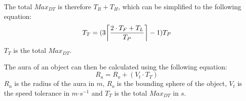 The total $Max_{DT}$ is therefore $T_{R}+T_{H}$, which can be simplified to the following equation:
\begin{equation}
T_{T}=(3\ceil*{\frac{2\cdot T_{F} + T_{L}}{T_{P}}}-1)T_{P}
\end{equation}
$T_{T}$ is the total $Max_{DT}$.

The aura of an object can then be calculated using the following equation: 
\begin{equation}\label{auraEquation}
R_{a}=R_{o}+(V_{t}\cdot T_{T})
\end{equation}
$R_{a}$ is the radius of the aura in $m$, $R_{o}$ is the bounding sphere of the object, $V_{t}$ is the speed tolerance in $m\mathord{\cdot}s^{-1}$ and $T_{T}$ is the total $Max_{DT}$ in $s$.

\begin{figure}[!t]	
	\begin{tikzpicture}[line cap=round,line join=round,>=triangle 45,x=1cm,y=1cm,every node/.style={font=\scriptsize,
		minimum height=0.25cm,minimum width=0.5cm},,scale=1.0]


\end{tikzpicture}
\end{figure}
